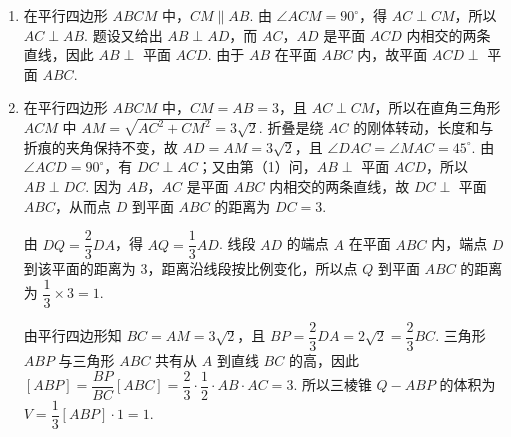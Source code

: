 \begin{solution}
\begin{enumerate}
\item 在平行四边形 \(ABCM\) 中，\(CM\parallel AB\). 由 \(\angle ACM=90^\circ\)，得 \(AC\perp CM\)，所以 \(AC\perp AB\). 题设又给出 \(AB\perp AD\)，而 \(AC\)，\(AD\) 是平面 \(ACD\) 内相交的两条直线，因此 \(AB\perp\) 平面 \(ACD\). 由于 \(AB\) 在平面 \(ABC\) 内，故平面 \(ACD\perp\) 平面 \(ABC\).
\item 在平行四边形 \(ABCM\) 中，\(CM=AB=3\)，且 \(AC\perp CM\)，所以在直角三角形 \(ACM\) 中
\(AM=\sqrt{AC^2+CM^2}=3\sqrt2\).
折叠是绕 \(AC\) 的刚体转动，长度和与折痕的夹角保持不变，故 \(AD=AM=3\sqrt2\)，且 \(\angle DAC=\angle MAC=45^\circ\). 由 \(\angle ACD=90^\circ\)，有 \(DC\perp AC\)；又由第（1）问，\(AB\perp\) 平面 \(ACD\)，所以 \(AB\perp DC\). 因为 \(AB\)，\(AC\) 是平面 \(ABC\) 内相交的两条直线，故 \(DC\perp\) 平面 \(ABC\)，从而点 \(D\) 到平面 \(ABC\) 的距离为 \(DC=3\).

由 \(DQ=\dfrac23DA\)，得 \(AQ=\dfrac13AD\). 线段 \(AD\) 的端点 \(A\) 在平面 \(ABC\) 内，端点 \(D\) 到该平面的距离为 \(3\)，距离沿线段按比例变化，所以点 \(Q\) 到平面 \(ABC\) 的距离为 \(\dfrac13\times3=1\).

由平行四边形知 \(BC=AM=3\sqrt2\)，且
\(BP=\dfrac23DA=2\sqrt2=\dfrac23BC\). 三角形 \(ABP\) 与三角形 \(ABC\) 共有从 \(A\) 到直线 \(BC\) 的高，因此
\([ABP]=\dfrac{BP}{BC}[ABC]=\dfrac23\cdot\dfrac12\cdot AB\cdot AC=3\).
所以三棱锥 \(Q-ABP\) 的体积为
\(V=\dfrac13[ABP]\cdot1=1\).
\end{enumerate}
\end{solution}

